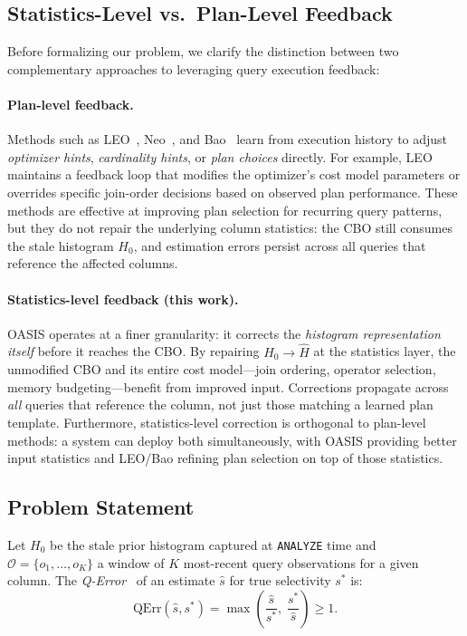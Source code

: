 \documentclass[runningheads]{llncs}
\begin{document}
\subsection{Statistics-Level vs.\ Plan-Level Feedback}
\label{sec:two_levels}

Before formalizing our problem, we clarify the distinction between two
complementary approaches to leveraging query execution feedback:
\paragraph{Plan-level feedback.}
Methods such as LEO~\cite{stillger2001leo}, Neo~\cite{marcus2019neo}, and
Bao~\cite{marcus2022bao} learn from execution history to adjust
\emph{optimizer hints}, \emph{cardinality hints}, or \emph{plan choices}
directly.
For example, LEO maintains a feedback loop that modifies the optimizer's
cost model parameters or overrides specific join-order decisions based on
observed plan performance.
These methods are effective at improving plan selection for recurring query
patterns, but they do not repair the underlying column statistics: the CBO
still consumes the stale histogram $H_0$, and estimation errors persist
across all queries that reference the affected columns.
\paragraph{Statistics-level feedback (this work).}
OASIS operates at a finer granularity: it corrects the \emph{histogram
representation itself} before it reaches the CBO.
By repairing $H_0 \to \hat{H}$ at the statistics layer, the unmodified CBO
and its entire cost model—join ordering, operator selection, memory
budgeting—benefit from improved input.
Corrections propagate across \emph{all} queries that reference the column,
not just those matching a learned plan template.
Furthermore, statistics-level correction is orthogonal to plan-level methods:
a system can deploy both simultaneously, with OASIS providing better input
statistics and LEO/Bao refining plan selection on top of those statistics.

\subsection{Problem Statement}

Let $H_0$ be the stale prior histogram captured at \texttt{ANALYZE} time and
$\mathcal{O} = \{o_1, \ldots, o_K\}$ a window of $K$ most-recent query
observations for a given column.
The \emph{Q-Error}~\cite{moerkotte2009preventing} of an estimate $\hat{s}$
for true selectivity $s^*$ is:
\begin{equation}
  \mathrm{QErr}(\hat{s}, s^*) = \max\!\left(\frac{\hat{s}}{s^*},\;
                                              \frac{s^*}{\hat{s}}\right) \geq 1.
  \label{eq:qerr}
\end{equation}
\end{document}
